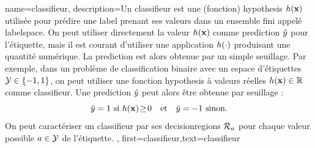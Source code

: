 {	name={classifieur},
	description={Un classifieur est une (fonction) \gls{hypothesis} $h({\bf x})$ utilisée pour prédire une \gls{label} prenant ses valeurs dans un ensemble fini appelé \gls{labelspace}. On peut utiliser directement la valeur $h({\bf x})$ comme \gls{prediction} $\hat{y}$ pour l’étiquette, mais il est courant d’utiliser une application $h(\cdot)$ produisant une quantité numérique. La \gls{prediction} est alors obtenue par un simple seuillage. 		
		Par exemple, dans un problème de \gls{classification} binaire avec un espace d’étiquettes $\mathcal{Y} \in \{ -1,1 \}$, on peut utiliser une fonction \gls{hypothesis} à valeurs réelles $h({\bf x}) \in \mathbb{R}$ comme classifieur. Une \gls{prediction} $\hat{y}$ peut alors être obtenue par seuillage :
		\begin{equation}
			\label{equ_def_threshold_bin_classifier_dict}
			\hat{y} =1 \text{ si } h({\bf x})\!\geq\!0 \quad \text{et} \quad \hat{y} = -1 \text{ sinon.}
		\end{equation}		
		On peut caractériser un classifieur par ses \glspl{decisionregion} $\mathcal{R}_{a}$ pour chaque valeur possible $a \in \mathcal{Y}$ de l’étiquette.
	},
	first={classifieur},text={classifieur}
}

